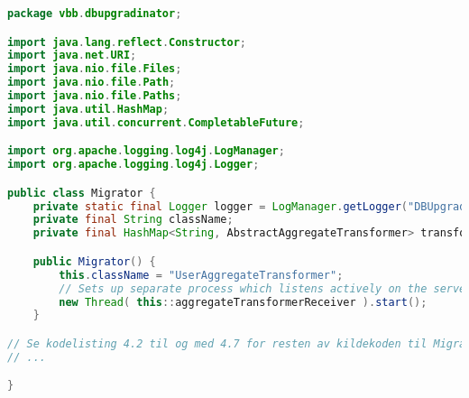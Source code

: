 \begin{lstlisting}[language=Java, caption={Migrator-klassen i DBUpgradinator}]
package vbb.dbupgradinator;

import java.lang.reflect.Constructor;
import java.net.URI;
import java.nio.file.Files;
import java.nio.file.Path;
import java.nio.file.Paths;
import java.util.HashMap;
import java.util.concurrent.CompletableFuture;

import org.apache.logging.log4j.LogManager;
import org.apache.logging.log4j.Logger;

public class Migrator {
    private static final Logger logger = LogManager.getLogger("DBUpgradinator");
    private final String className;
    private final HashMap<String, AbstractAggregateTransformer> transformers = new HashMap<>(4, (float) 0.95);

    public Migrator() {
        this.className = "UserAggregateTransformer";
        // Sets up separate process which listens actively on the server socket
        new Thread( this::aggregateTransformerReceiver ).start();
    }

// Se kodelisting 4.2 til og med 4.7 for resten av kildekoden til Migrator
// ...

}
\end{lstlisting}
